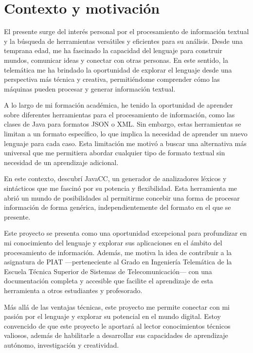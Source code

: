 \section{Contexto y motivación}

\noindent El presente \pfg surge del interés personal por el procesamiento de información textual y la búsqueda de herramientas versátiles y eficientes para su análisis. Desde una temprana edad, me ha fascinado la capacidad del lenguaje para construir mundos, comunicar ideas y conectar con otras personas. En este sentido, la telemática me ha brindado la oportunidad de explorar el lenguaje desde una perspectiva más técnica y creativa, permitiéndome comprender cómo las máquinas pueden procesar y generar información textual.

A lo largo de mi formación académica, he tenido la oportunidad de aprender sobre diferentes herramientas para el procesamiento de información, como las clases de Java para formatos JSON o XML. Sin embargo, estas herramientas se limitan a un formato específico, lo que implica la necesidad de aprender un nuevo lenguaje para cada caso. Esta limitación me motivó a buscar una alternativa más universal que me permitiera abordar cualquier tipo de formato textual sin necesidad de un aprendizaje adicional.

En este contexto, descubrí JavaCC, un generador de analizadores léxicos y sintácticos que me fascinó por su potencia y flexibilidad\cite{javaccgithub}. Esta herramienta me abrió un mundo de posibilidades al permitirme concebir una forma de procesar información de forma genérica, independientemente del formato en el que se presente.

Este proyecto se presenta como una oportunidad excepcional para profundizar en mi conocimiento del lenguaje y explorar sus aplicaciones en el ámbito del procesamiento de información. Además, me motiva la idea de contribuir a la asignatura de PIAT ---perteneciente al Grado en Ingeniería Telemática de la Escuela Técnica Superior de Sistemas de Telecomunicación--- con una documentación completa y accesible que facilite el aprendizaje de esta herramienta a otros estudiantes y profesorado.

Más allá de las ventajas técnicas, este proyecto me permite conectar con mi pasión por el lenguaje y explorar su potencial en el mundo digital. Estoy convencido de que este proyecto le aportará al lector conocimientos técnicos valiosos, además de habilitarle a desarrollar sus capacidades de aprendizaje autónomo, investigación y creatividad. 

